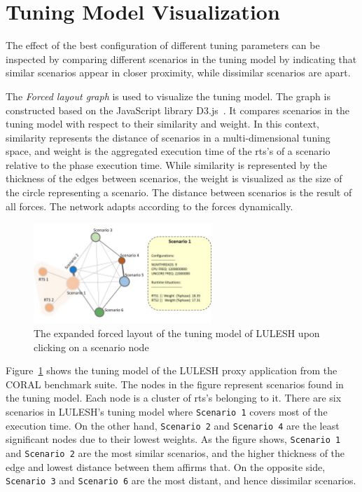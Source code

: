 \section{Tuning Model Visualization} \label{sec:tm-visualization}
The effect of the best configuration of different tuning parameters can be inspected by comparing different scenarios in the tuning model by indicating that similar scenarios appear in closer proximity, while dissimilar scenarios are apart.

The \textit{Forced layout graph} is used to visualize the tuning model. The graph is constructed based on the JavaScript library D3.js~\cite{bostock2011d3}. It compares scenarios in the tuning model with respect to their similarity and weight. In this context, similarity represents the distance of scenarios in a multi-dimensional tuning space, and weight is the aggregated execution time of the rts's of a scenario relative to the phase execution time. While similarity is represented by the thickness of the edges between scenarios, the weight is visualized as the size of the circle representing a scenario. The distance between scenarios is the result of all forces. The network adapts according to the forces dynamically. 

\begin{figure}
	\begin{mdframed}
	\centering
		\includegraphics[width=0.60\textwidth]{figures/luleshTM_expand.jpg}
	\end{mdframed}
	\caption{\label{fig:forced-layout-expand}The expanded forced layout of the tuning model of LULESH upon clicking on a scenario node }
\end{figure}

Figure~\ref{fig:forced-layout-expand} shows the tuning model of the LULESH proxy application from the CORAL benchmark suite. The nodes in the figure represent scenarios found in the tuning model. Each node is a cluster of rts's belonging to it. There are six scenarios in LULESH's tuning model where \texttt{Scenario~1} covers most of the execution time. On the other hand, \texttt{Scenario~2} and \texttt{Scenario~4} are the least significant nodes due to their lowest weights. As the figure shows, \texttt{Scenario~1} and \texttt{Scenario~2} are the most similar scenarios, and the higher thickness of the edge and lowest distance between them affirms that. On the opposite side, \texttt{Scenario~3} and \texttt{Scenario~6} are the most distant, and hence dissimilar scenarios.

